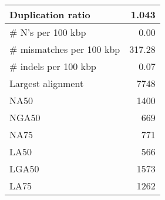 \documentclass[12pt,a4paper]{article}
\begin{document}
\begin{table}[ht]
\begin{center}
\begin{tabular}{|l*{1}{|r}|}
Duplication ratio & 1.043 \\ \hline
\# N's per 100 kbp & 0.00 \\ \hline
\# mismatches per 100 kbp & 317.28 \\ \hline
\# indels per 100 kbp & 0.07 \\ \hline
Largest alignment & 7748 \\ \hline
NA50 & 1400 \\ \hline
NGA50 & 669 \\ \hline
NA75 & 771 \\ \hline
LA50 & 566 \\ \hline
LGA50 & 1573 \\ \hline
LA75 & 1262 \\ \hline
\end{tabular}
\end{center}
\end{table}
\end{document}
